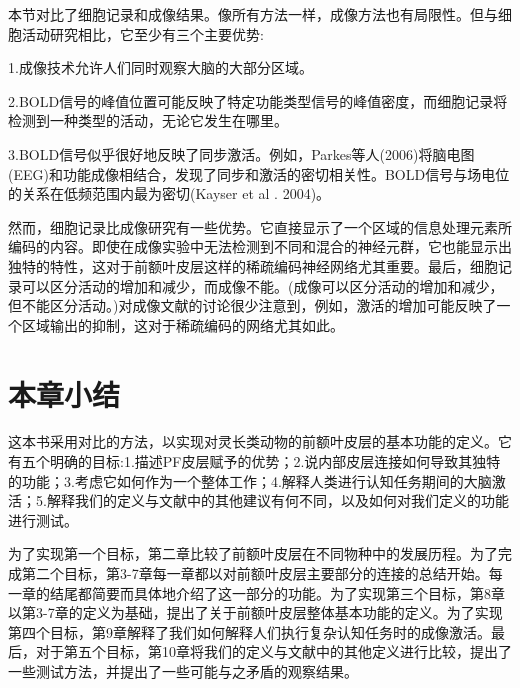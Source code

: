 \par
本节对比了细胞记录和成像结果。像所有方法一样，成像方法也有局限性。但与细胞活动研究相比，它至少有三个主要优势:
\par 1.成像技术允许人们同时观察大脑的大部分区域。
\par 2.BOLD信号的峰值位置可能反映了特定功能类型信号的峰值密度，而细胞记录将检测到一种类型的活动，无论它发生在哪里。
\par 3.BOLD信号似乎很好地反映了同步激活。例如，Parkes等人(2006)将脑电图(EEG)和功能成像相结合，发现了同步和激活的密切相关性。BOLD信号与场电位的关系在低频范围内最为密切(Kayser et al . 2004)。

\par 然而，细胞记录比成像研究有一些优势。它直接显示了一个区域的信息处理元素所编码的内容。即使在成像实验中无法检测到不同和混合的神经元群，它也能显示出独特的特性，这对于前额叶皮层这样的稀疏编码神经网络尤其重要。最后，细胞记录可以区分活动的增加和减少，而成像不能。(成像可以区分活动的增加和减少，但不能区分活动。)对成像文献的讨论很少注意到，例如，激活的增加可能反映了一个区域输出的抑制，这对于稀疏编码的网络尤其如此。

\section{本章小结}
这本书采用对比的方法，以实现对灵长类动物的前额叶皮层的基本功能的定义。它有五个明确的目标:1.描述PF皮层赋予的优势；2.说内部皮层连接如何导致其独特的功能；3.考虑它如何作为一个整体工作；4.解释人类进行认知任务期间的大脑激活；5.解释我们的定义与文献中的其他建议有何不同，以及如何对我们定义的功能进行测试。


\par

为了实现第一个目标，第二章比较了前额叶皮层在不同物种中的发展历程。为了完成第二个目标，第3-7章每一章都以对前额叶皮层主要部分的连接的总结开始。每一章的结尾都简要而具体地介绍了这一部分的功能。为了实现第三个目标，第8章以第3-7章的定义为基础，提出了关于前额叶皮层整体基本功能的定义。为了实现第四个目标，第9章解释了我们如何解释人们执行复杂认知任务时的成像激活。最后，对于第五个目标，第10章将我们的定义与文献中的其他定义进行比较，提出了一些测试方法，并提出了一些可能与之矛盾的观察结果。




